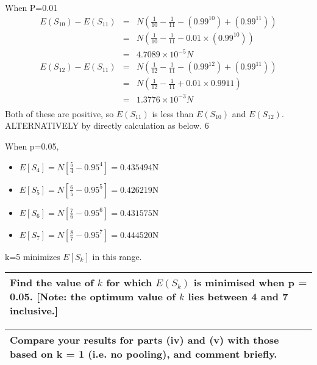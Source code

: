 \documentclass[a4paper,12pt]{article}
\begin{document}
\item When P=0.01
\begin{eqnarray*}
E(S_{10}) - E(S_{11}) &=& N \left( \frac{1}{10} -  \frac{1}{11} - (0.99^{10}) + (0.99^{11}) \right)
\\&=& N\left( \frac{1}{10} - \frac{1}{11} - 0.01 \times (0.99^{10})\right) \\&=& 4.7089 \times 10^{-5}N
\end{eqnarray*}
\begin{eqnarray*}
E(S_{12}) - E(S_{11}) &=& N \left( \frac{1}{12} - \frac{1}{11} - (0.99^{12}) + (0.99^{11}) \right)\\&=& N \left( \frac{1}{12} - \frac{1}{11} + 0.01 \times 0.9911 \right) \\&=&
 1.3776 \times 10^{-3} N\\
\end{eqnarray*}
Both of these are positive, so $E(S_{11})$ is less than $E(S_{10})$ and $E(S_{12})$.
ALTERNATIVELY by directly calculation as below.
6
\item When p=0.05,
\begin{itemize}
\item $E[S_{4}] = N[\frac{5}{4} - 0.95^4] = 0.435494$N
\item $E[S_{5}] = N[\frac{6}{5} - 0.95^5] = 0.426219$N
\item $E[S_{6}] = N[\frac{7}{6} - 0.95^6] = 0.431575$N
\item $E[S_{7}] = N[\frac{8}{7} - 0.95^7] = 0.444520$N
\end{itemize}

k=5 minimizes $E[S_{k}]$ in this range.
\newpage
  \begin{table}[ht!]
     \centering
     \begin{tabular}{|p{15cm}|}
     \hline  \large Find the value of $k$ for which $E(S_{k})$ is minimised when p = 0.05. [Note: the optimum value of $k$ lies between 4 and 7 inclusive.] 
\\ \hline
      \end{tabular}
    \end{table}
    
  \begin{table}[ht!]
     \centering
     \begin{tabular}{|p{15cm}|}
     \hline   Compare your results for parts (iv) and (v) with those based on k = 1 (i.e. no pooling), and comment briefly. 
\\ \hline
      \end{tabular}
    \end{table}
    
\end{document}
